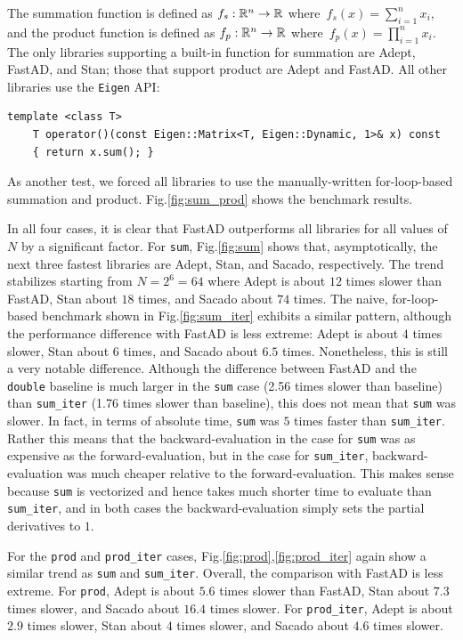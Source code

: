 The summation function is defined as $f_s:\mathbb{R}^n \to \mathbb{R}$ where~$f_s(x) = \sum\limits_{i=1}^n x_i$,
and the product function is defined as $f_p:\mathbb{R}^n \to \mathbb{R}$ where~$f_p(x) = \prod\limits_{i=1}^n x_i$.
The only libraries supporting a built-in function for summation are Adept, FastAD, and Stan;
those that support product are Adept and FastAD.\@
All other libraries use the \verb|Eigen| API:
\begin{lstlisting}[style=customcpp]
    template <class T>
    T operator()(const Eigen::Matrix<T, Eigen::Dynamic, 1>& x) const
    { return x.sum(); }
\end{lstlisting}
As another test, we forced all libraries to use the manually-written for-loop-based summation and product.
Fig.\ref{fig:sum_prod} shows the benchmark results.

In all four cases, it is clear that FastAD outperforms all libraries for all values of $N$
by a significant factor.
For \verb|sum|, Fig.\ref{fig:sum} shows that, asymptotically, 
the next three fastest libraries are Adept, Stan, and Sacado, respectively.
The trend stabilizes starting from $N=2^6=64$ where Adept is about $ 12$ times slower than
FastAD, Stan about $ 18$ times, and Sacado about $ 74$ times.
The naive, for-loop-based benchmark shown in Fig.\ref{fig:sum_iter} exhibits a similar pattern,
although the performance difference with FastAD is less extreme:
Adept is about $ 4$ times slower, 
Stan about $ 6$ times,
and Sacado about $ 6.5$ times.
Nonetheless, this is still a very notable difference.
Although the difference between FastAD and the \verb|double| baseline is much larger in
the \verb|sum| case (2.56 times slower than baseline) than 
\verb|sum_iter| (1.76 times slower than baseline), 
this does not mean that \verb|sum| was slower.
In fact, in terms of absolute time, \verb|sum| was $ 5$ times faster than \verb|sum_iter|. 
Rather this means that the backward-evaluation in the case for \verb|sum| was
as expensive as the forward-evaluation, but in the case for \verb|sum_iter|,
backward-evaluation was much cheaper relative to the forward-evaluation.
This makes sense because \verb|sum| is vectorized and hence takes much shorter time to evaluate
than \verb|sum_iter|, and in both cases the backward-evaluation simply sets the partial derivatives to $ 1$.

For the \verb|prod| and \verb|prod_iter| cases, 
Fig.\ref{fig:prod},\ref{fig:prod_iter} again show
a similar trend as \verb|sum| and \verb|sum_iter|.
Overall, the comparison with FastAD is less extreme.
For \verb|prod|, Adept is about $ 5.6$ times slower than FastAD,
Stan about $ 7.3$ times slower,
and Sacado about $ 16.4$ times slower.
For \verb|prod_iter|, Adept is about $2.9$ times slower,
Stan about $4$ times slower,
and Sacado about $4.6$ times slower.
